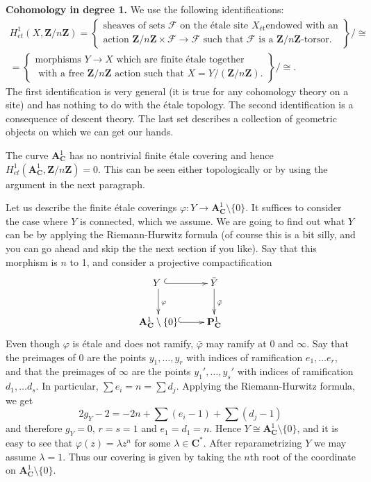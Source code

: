\medskip\noindent
{\bf Cohomology in degree 1.} We use the following identifications:
\begin{eqnarray*}
H_{et}^1 (X, \mathbf{Z}/n\mathbf{Z}) = \left\{
\begin{matrix}
\text{sheaves of sets $\mathcal{F}$ on the \'etale site $X_{\text{\'et}}$
endowed with an} \\
\text{action $\mathbf{Z}/n\mathbf{Z} \times \mathcal{F} \to \mathcal{F}$ such
that $\mathcal{F}$ is a $\mathbf{Z}/n\mathbf{Z}$-torsor.}
\end{matrix}
\right\}
\Big/ \cong
\\
 = \left\{
\begin{matrix}
\text{morphisms $Y \to X$ which are finite \'etale together} \\
\text{ with a free $\mathbf{Z}/n\mathbf{Z}$ action such that $X = Y
/(\mathbf{Z}/n\mathbf{Z})$.}
\end{matrix}
\right\}
\Big/ \cong.
\end{eqnarray*}
The first identification is very general (it is true for any cohomology theory
on a site) and has nothing to do with the \'etale topology. The second
identification is a consequence of descent theory. The last set describes a
collection of geometric objects on which we can get our hands.

\medskip\noindent
The curve $\mathbf{A}^1_\mathbf{C}$ has no nontrivial finite \'etale covering
and hence $H_{et}^1 (\mathbf{A}^1_\mathbf{C}, \mathbf{Z}/n\mathbf{Z}) = 0$.
This can be seen either topologically or by using the argument in the next
paragraph.

\medskip\noindent
Let us describe the finite \'etale coverings
$\varphi: Y \to \mathbf{A}^1_\mathbf{C} \setminus \{0\}$.
It suffices to consider the case where $Y$ is
connected, which we assume. We are going to find out what $Y$ can be
by applying the Riemann-Hurwitz formula (of course this is a bit silly, and
you can go ahead and skip the the next section if you like).
Say that this morphism is $n$ to 1, and consider a
projective compactification
$$
\xymatrix{
{Y\ } \ar@{^{(}->}[r] \ar^{\varphi}[d] &
{\bar Y} \ar^{\bar\varphi}[d] \\
{\mathbf{A}^1_\mathbf{C} \setminus \{0\}} \ar@{^{(}->}[r] &
{\mathbf{P}^1_\mathbf{C}}
}
$$
Even though $\varphi$ is \'etale and does not ramify, $\bar{\varphi}$ may
ramify at 0 and $\infty$. Say that the preimages of 0 are the points $y_1,
\dots, y_r$ with indices of ramification $e_1, \dots e_r$, and that the
preimages of $\infty$ are the points $y_1', \dots, y_s'$ with indices of
ramification $d_1, \dots d_s$. In particular, $\sum e_i = n = \sum d_j$.
Applying the Riemann-Hurwitz formula, we get
$$
2 g_Y - 2 = -2n + \sum (e_i - 1) + \sum (d_j - 1)
$$
and therefore $g_Y = 0$, $r=s=1$ and $e_1 = d_1 = n$.
Hence $Y \cong {\mathbf{A}^1_\mathbf{C} \setminus \{0\}}$, and it is easy to
see that $\varphi(z) = \lambda z^n$ for some $\lambda \in \mathbf{C}^*$.
After reparametrizing $Y$ we may assume $\lambda = 1$. Thus our
covering is given by taking the $n$th root of the coordinate on
$\mathbf{A}^1_{\mathbf{C}} \setminus \{0\}$.

